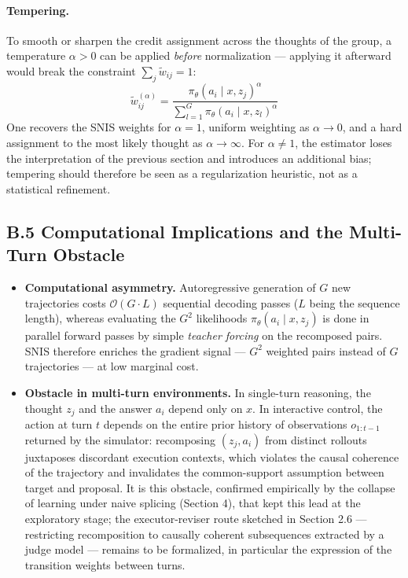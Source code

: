 \documentclass[11pt,a4paper]{article}
\begin{document}
\paragraph{Tempering.} To smooth or sharpen the credit assignment across the thoughts of the group, a temperature $\alpha > 0$ can be applied \emph{before} normalization — applying it afterward would break the constraint $\sum_j \tilde{w}_{ij} = 1$:
\begin{equation}
\tilde{w}_{ij}^{(\alpha)} = \frac{\pi_\theta(a_i \mid x, z_j)^\alpha}{\sum_{l=1}^G \pi_\theta(a_i \mid x, z_l)^\alpha}
\end{equation}
One recovers the SNIS weights for $\alpha = 1$, uniform weighting as $\alpha \to 0$, and a hard assignment to the most likely thought as $\alpha \to \infty$. For $\alpha \neq 1$, the estimator loses the interpretation of the previous section and introduces an additional bias; tempering should therefore be seen as a regularization heuristic, not as a statistical refinement.

\subsection*{B.5 Computational Implications and the Multi-Turn Obstacle}
\begin{itemize}
    \item \textbf{Computational asymmetry.} Autoregressive generation of $G$ new trajectories costs $\mathcal{O}(G \cdot L)$ sequential decoding passes ($L$ being the sequence length), whereas evaluating the $G^2$ likelihoods $\pi_\theta(a_i \mid x, z_j)$ is done in parallel forward passes by simple \emph{teacher forcing} on the recomposed pairs. SNIS therefore enriches the gradient signal — $G^2$ weighted pairs instead of $G$ trajectories — at low marginal cost.
    \item \textbf{Obstacle in multi-turn environments.} In single-turn reasoning, the thought $z_j$ and the answer $a_i$ depend only on $x$. In interactive control, the action at turn $t$ depends on the entire prior history of observations $o_{1:t-1}$ returned by the simulator: recomposing $(z_j, a_i)$ from distinct rollouts juxtaposes discordant execution contexts, which violates the causal coherence of the trajectory and invalidates the common-support assumption between target and proposal. It is this obstacle, confirmed empirically by the collapse of learning under naive splicing (Section 4), that kept this lead at the exploratory stage; the executor-reviser route sketched in Section 2.6 — restricting recomposition to causally coherent subsequences extracted by a judge model — remains to be formalized, in particular the expression of the transition weights between turns.
\end{itemize}
\end{document}

